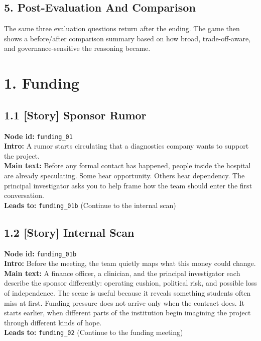 \documentclass[11pt]{article}
\begin{document}
\subsection*{5. Post-Evaluation And Comparison}
The same three evaluation questions return after the ending. The game then shows a before/after comparison summary based on how broad, trade-off-aware, and governance-sensitive the reasoning became.
\section*{1. Funding}
\subsection*{1.1 [Story] Sponsor Rumor}
\textbf{Node id:} \texttt{funding\_01}\\
\textbf{Intro:} A rumor starts circulating that a diagnostics company wants to support the project.\\
\textbf{Main text:} Before any formal contact has happened, people inside the hospital are already speculating. Some hear opportunity. Others hear dependency. The principal investigator asks you to help frame how the team should enter the first conversation.\\
\textbf{Leads to:} \texttt{funding\_01b} (Continue to the internal scan)\\
\subsection*{1.2 [Story] Internal Scan}
\textbf{Node id:} \texttt{funding\_01b}\\
\textbf{Intro:} Before the meeting, the team quietly maps what this money could change.\\
\textbf{Main text:} A finance officer, a clinician, and the principal investigator each describe the sponsor differently: operating cushion, political risk, and possible loss of independence. The scene is useful because it reveals something students often miss at first. Funding pressure does not arrive only when the contract does. It starts earlier, when different parts of the institution begin imagining the project through different kinds of hope.\\
\textbf{Leads to:} \texttt{funding\_02} (Continue to the funding meeting)\\
\end{document}

